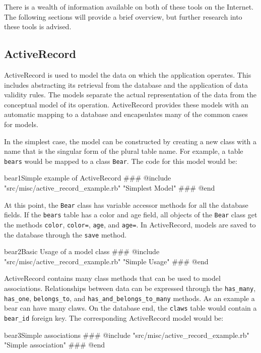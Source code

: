 \documentclass[12pt]{article}
\begin{document}
There is a wealth of information available on both of these tools on the Internet.  The following sections will provide a brief overview, but further research into these tools is advised.

\subsection*{ActiveRecord}

ActiveRecord is used to model the data on which the application operates.  This includes abstracting its retrieval from the database and the application of data validity rules.  The models separate the actual representation of the data from the conceptual model of its operation.  ActiveRecord provides these models with an automatic mapping to a database and encapsulates many of the common cases for models.

In the simplest case, the model can be constructed by creating a new class with a name that is the singular form of the plural table name.  For example, a table \texttt{bears} would be mapped to a class \texttt{Bear}.  The code for this model would be:

\begin{code}{bear1}{Simple example of ActiveRecord}
### @include "src/misc/active_record_example.rb" "Simplest Model"
### @end
\end{code}

At this point, the \texttt{Bear} class has variable accessor methods for all the database fields.  If the \texttt{bears} table has a color and age field, all objects of the \texttt{Bear} class get the methods \texttt{color}, \texttt{color=}, \texttt{age}, and \texttt{age=}.  In ActiveRecord, models are saved to the database through the \texttt{save} method.

\begin{code}{bear2}{Basic Usage of a model class}
### @include "src/misc/active_record_example.rb" "Simple Usage"
### @end
\end{code}

ActiveRecord contains many class methods that can be used to model associations. Relationships between data can be expressed through the \texttt{has\_many}, \texttt{has\_one}, \texttt{belongs\_to}, and \texttt{has\_and\_belongs\_to\_many} methods.  As an example a bear can have many claws.  On the database end, the \texttt{claws} table would contain a \texttt{bear\_id} foreign key.  The corresponding ActiveRecord model would be:

\begin{code}{bear3}{Simple associations}
### @include "src/misc/active_record_example.rb" "Simple association"
### @end
\end{code}
\end{document}
